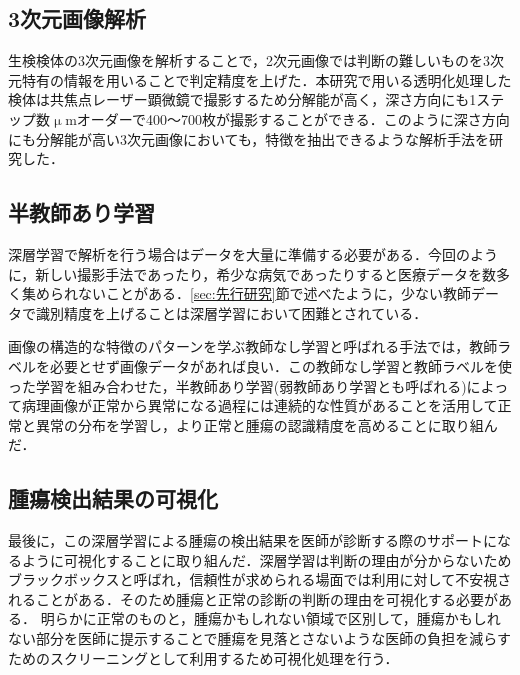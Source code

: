 \subsection*{3次元画像解析}
生検検体の3次元画像を解析することで，2次元画像では判断の難しいものを3次元特有の情報を用いることで判定精度を上げた．本研究で用いる透明化処理した検体は共焦点レーザー顕微鏡で撮影するため分解能が高く，深さ方向にも1ステップ数$\upmu$mオーダーで400〜700枚が撮影することができる．このように深さ方向にも分解能が高い3次元画像においても，特徴を抽出できるような解析手法を研究した．

\subsection*{半教師あり学習}
深層学習で解析を行う場合はデータを大量に準備する必要がある．今回のように，新しい撮影手法であったり，希少な病気であったりすると医療データを数多く集められないことがある．\ref{sec:先行研究}節で述べたように，少ない教師データで識別精度を上げることは深層学習において困難とされている．

画像の構造的な特徴のパターンを学ぶ教師なし学習と呼ばれる手法では，教師ラベルを必要とせず画像データがあれば良い．この教師なし学習と教師ラベルを使った学習を組み合わせた，半教師あり学習(弱教師あり学習とも呼ばれる)によって病理画像が正常から異常になる過程には連続的な性質があることを活用して正常と異常の分布を学習し，より正常と腫瘍の認識精度を高めることに取り組んだ．

\subsection*{腫瘍検出結果の可視化}
最後に，この深層学習による腫瘍の検出結果を医師が診断する際のサポートになるように可視化することに取り組んだ．深層学習は判断の理由が分からないためブラックボックスと呼ばれ，信頼性が求められる場面では利用に対して不安視されることがある．そのため腫瘍と正常の診断の判断の理由を可視化する必要がある．
明らかに正常のものと，腫瘍かもしれない領域で区別して，腫瘍かもしれない部分を医師に提示することで腫瘍を見落とさないような医師の負担を減らすためのスクリーニングとして利用するため可視化処理を行う．

